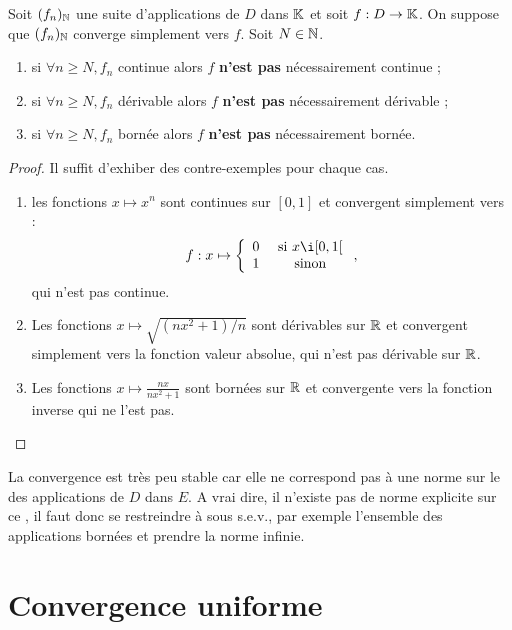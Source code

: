 \documentclass{article}
\begin{document}
\begin{thm}
Soit $(f_n)_{\mathbb{N}}$ une suite d'applications de $D$ dans $\mathbb{K}$ et soit $f:D \to \mathbb{K}$. On suppose que $(f_n)_{\mathbb{N}}$ converge simplement vers $f$.
Soit $N \in \mathbb{N}$.
\begin{enumerate}[label=(\roman*)]
\item si $\forall n \geq N, f_n$ continue alors $f$ \textbf{n'est pas} nécessairement continue ;
\item si $\forall n \geq N, f_n$ dérivable alors $f$ \textbf{n'est pas} nécessairement dérivable ;
\item si $\forall n \geq N, f_n$ bornée alors $f$ \textbf{n'est pas} nécessairement bornée.
\end{enumerate}
\end{thm}

\begin{proof}
Il suffit d'exhiber des contre-exemples pour chaque cas.
\begin{enumerate}[label=(\roman*)]
\item les fonctions $x \mapsto x^n$ sont continues sur $[0,1]$ et convergent simplement vers :
\[ f : x \mapsto \left \{ \begin{array}{c c c} 0 & \text{ si } x \i [0, 1[ \\ 1 & \text{ sinon} \end{array} \right. , \]
qui n'est pas continue.
\item Les fonctions $x \mapsto \sqrt{(nx^2+1)/n}$ sont dérivables sur $\mathbb{R}$ et convergent simplement vers la fonction valeur absolue,
qui n'est pas dérivable sur $\mathbb{R}$.
\item Les fonctions $x \mapsto \frac{nx}{nx^2+1}$ sont bornées sur $\mathbb{R}$ et convergente vers la fonction inverse qui ne l'est pas.
\end{enumerate}
\end{proof}

\begin{rmq}
La convergence est très peu stable car elle ne correspond pas à une norme sur le \Kev des applications de $D$ dans $E$.
A vrai dire, il n'existe pas de norme explicite sur ce \Kev, il faut donc se restreindre à sous s.e.v., par exemple l'ensemble des applications
bornées et prendre la norme infinie.
\end{rmq}

\section{Convergence uniforme}
\end{document}

